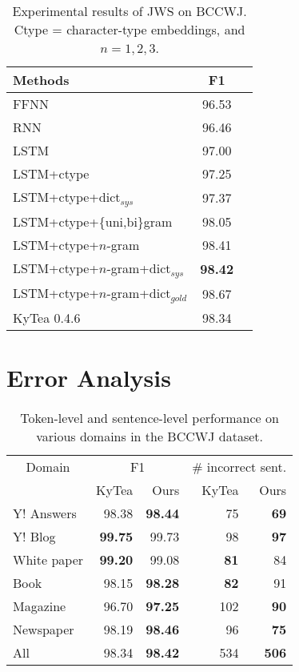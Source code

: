 \documentclass[11pt]{article}
\begin{document}
\begin{table}[t]
\caption{Experimental results of JWS on BCCWJ.
Ctype = character-type embeddings, and $n = 1,2,3$.}
\label{state_result}
\centering
\begin{tabular}{lcc}
\toprule
    Methods & F1 \\
  \midrule                  
      FFNN                              & 96.53 \\
      RNN                               & 96.46 \\
      LSTM                              & 97.00 \\
      LSTM+ctype                        & 97.25 \\    
      LSTM+ctype+dict$_{\mathit{sys}}$  & 97.37 \\
      LSTM+ctype+\{uni,bi\}gram         & 98.05 \\
      LSTM+ctype+$n$-gram               & 98.41 \\ 
      LSTM+ctype+$n$-gram+dict$_{\mathit{sys}}$  &{\bf 98.42} \\ 
      LSTM+ctype+$n$-gram+dict$_{\mathit{gold}}$ & 98.67 \\
  \midrule
      KyTea 0.4.6                       & 98.34 \\
  \bottomrule
\end{tabular}
\end{table} 

\section{Error Analysis}

\begin{table}[t]
\caption{Token-level and sentence-level performance on various domains in
    the BCCWJ dataset.}
\label{error}
\centering
\begin{tabular}{lrrrr}
  \toprule
  \multicolumn{1}{c}{Domain} & \multicolumn{2}{c}{F1} & \multicolumn{2}{c}{\# incorrect sent.} \\
  \multicolumn{1}{c}{} & KyTea & Ours & KyTea & Ours \\   
  \midrule
  Y! Answers    & 98.38       & {\bf 98.44} &75     & {\bf69}\\     
  Y! Blog       & {\bf 99.75} & 99.73       &98     & {\bf97}\\
  White paper   & {\bf 99.20} & 99.08       &{\bf81}& 84\\
  Book          & 98.15       & {\bf 98.28} &{\bf82}& 91\\ 
  Magazine      & 96.70       & {\bf 97.25} &102    & {\bf90} \\ 
  Newspaper     & 98.19       & {\bf 98.46} &96     & {\bf75}\\
  \midrule                                  
  All           & 98.34       & {\bf 98.42} &534    & {\bf506}\\
  \bottomrule
\end{tabular}
\end{table}
\end{document}
